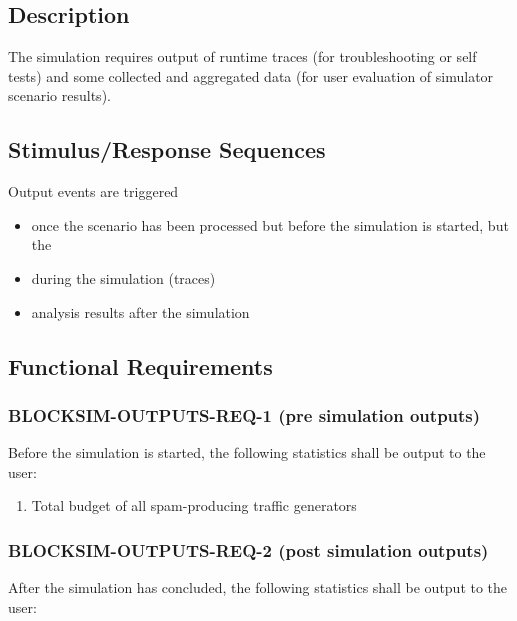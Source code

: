 \documentclass{scrreprt}
\begin{document}
    \subsection{Description}

      The simulation requires output of runtime traces (for troubleshooting or
      self tests) and some collected and aggregated data (for user evaluation
      of simulator scenario results).

    \subsection{Stimulus/Response Sequences}

      Output events are triggered

      \begin{itemize}
        \item once the scenario has been processed but before the
          simulation is started, but the
        \item during the simulation (traces)
        \item analysis results after the simulation
      \end{itemize}

    \subsection{Functional Requirements}

      \subsubsection{BLOCKSIM-OUTPUTS-REQ-1 (pre simulation outputs)}

        Before the simulation is started, the following statistics shall be
        output to the user:

        \begin{enumerate}
          \item Total budget of all spam-producing traffic generators
        \end{enumerate}

      \subsubsection{BLOCKSIM-OUTPUTS-REQ-2 (post simulation outputs)}

        After the simulation has concluded, the following statistics shall be
        output to the user:
\end{document}
